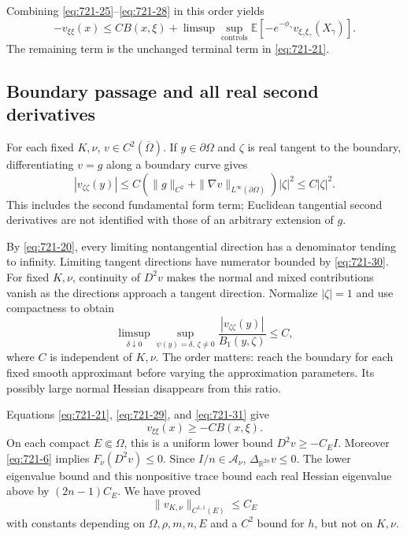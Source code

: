 \documentclass[11pt,a4paper]{article}
\theoremstyle{remark}
\begin{document}
Combining \eqref{eq:721-25}--\eqref{eq:721-28} in this order yields
\begin{equation}
 -v_{\xi\xi}(x)\le CB(x,\xi)
 +\limsup\sup_{\text{controls}}
       \mathbb E[-e^{-\phi_\gamma}
                         v_{\xi_\gamma\xi_\gamma}(X_\gamma)].
 \label{eq:721-29}
\end{equation}
The remaining term is the unchanged terminal term in \eqref{eq:721-21}.

\subsection{Boundary passage and all real second derivatives}

For each fixed $K,\nu$, $v\in C^2(\overline\Omega)$.
If $y\in\partial\Omega$ and $\zeta$ is real tangent to the boundary,
differentiating $v=g$ along a boundary curve gives
\begin{equation}
 |v_{\zeta\zeta}(y)|
 \le C\left(\|g\|_{C^2}
                  +\|\nabla v\|_{L^\infty(\partial\Omega)}\right)
          |\zeta|^2\le C|\zeta|^2.
 \label{eq:721-30}
\end{equation}
This includes the second fundamental form term; Euclidean tangential second
derivatives are not identified with those of an arbitrary extension of $g$.

By \eqref{eq:721-20}, every limiting nontangential direction has a denominator tending
to infinity.  Limiting tangent directions have numerator bounded by
\eqref{eq:721-30}.  For fixed $K,\nu$, continuity of $D^2v$ makes the normal and
mixed contributions vanish as the directions approach a tangent direction.
Normalize $|\zeta|=1$ and use compactness to obtain
\begin{equation}
 \limsup_{\delta\downarrow0}
 \sup_{\psi(y)=\delta,\,\zeta\ne0}
       \frac{|v_{\zeta\zeta}(y)|}{B_1(y,\zeta)}\le C,
 \label{eq:721-31}
\end{equation}
where $C$ is independent of $K,\nu$.
The order matters: reach the boundary for each fixed smooth approximant
before varying the approximation parameters.  Its possibly large normal
Hessian disappears from this ratio.

Equations \eqref{eq:721-21}, \eqref{eq:721-29}, and \eqref{eq:721-31} give
\begin{equation}
 v_{\xi\xi}(x)\ge-CB(x,\xi).
 \label{eq:721-32}
\end{equation}
On each compact $E\Subset\Omega$, this is a uniform lower bound
$D^2v\ge-C_EI$.  Moreover \eqref{eq:721-6} implies $F_\nu(D^2v)\le0$.
Since $I/n\in\mathcal A_\nu$, $\Delta_{\mathbb R^{2n}}v\le0$.
The lower eigenvalue bound and this nonpositive trace bound each real
Hessian eigenvalue above by $(2n-1)C_E$.  We have proved
\begin{equation}
 \|v_{K,\nu}\|_{C^{1,1}(E)}\le C_E
 \label{eq:721-33}
\end{equation}
with constants depending on $\Omega,\rho,m,n,E$ and a $C^2$ bound for $h$,
but not on $K,\nu$.
\end{document}
